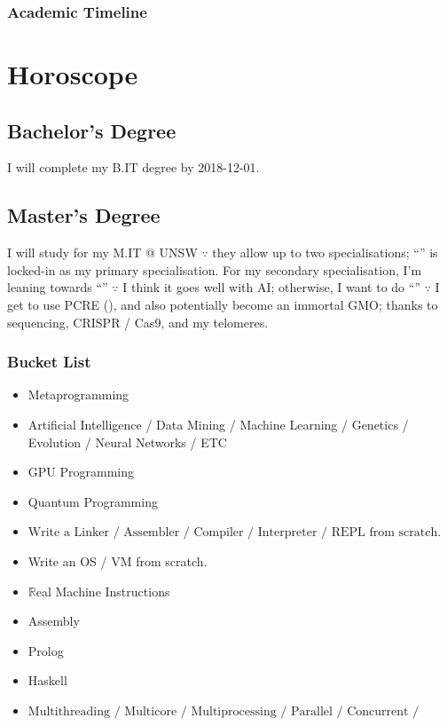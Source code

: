\documentclass[12pt,a4paper,oneside]{article}
\newcommand{\sh}[1]{{\color{gray}{#1}}}
\begin{document}
\subsubsection{Academic Timeline}


\newpage
\section{Horoscope}
\subsection{Bachelor's Degree}
I will complete my B.IT degree by 2018-12-01.
\subsection{Master's Degree}
\noindent{}I will study for my M.IT @ UNSW $\because$ they allow up to two specialisations; ``\sh{Artificial Intelligence}'' is locked-in as my primary specialisation.
For my secondary specialisation, I'm leaning towards ``\sh{Data Science and Engineering}'' $\because$ I think it goes well with AI; otherwise, I want to do ``\sh{Bioinformatics}'' $\because$ I get to use PCRE (\sh{and get away with it}), and also potentially become an immortal G\sout{\sh{od}}MO; thanks to sequencing, CRISPR / Cas9, and my telomeres.
\subsubsection{Bucket List}
\begin{itemize}
    \item Metaprogramming
    \item Artificial Intelligence / Data Mining / Machine Learning / Genetics / Evolution / Neural Networks / ETC
    \item GPU Programming
    \item Quantum Programming
    \item $\text{Write a Linker / Assembler / Compiler / Interpreter / REPL from scratch.}$
    \item Write an OS / VM from scratch.
    \item $\mathbb{R}$eal Machine Instructions
    \item Assembly
    \item Prolog
    \item Haskell
    \item $\text{Multithreading / Multicore / Multiprocessing / Parallel / Concurrent / Distributed / Asynchronous / ETC}$
\end{itemize}
\end{document}
